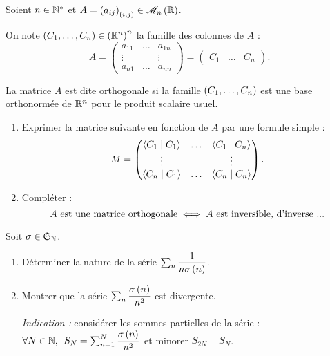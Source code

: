 \begin{exo}
Soient \(n\in\mathbb{N}^*\) et \(A=\paren{a_{ij}}_{\paren{i,j}}\in\M{n}[\R]\).

On note \(\left(C_1,\dots,C_n\right)\in\left(\mathbb{R}^n\right)^n\) la famille des colonnes de \(A\) : \[A=\begin{pmatrix}
a_{11} & \dots & a_{1n} \\
\vdots &  & \vdots \\
a_{n1} & \dots & a_{nn}
\end{pmatrix}=\begin{pmatrix}
C_1 & \dots & C_n
\end{pmatrix}.\]

La matrice \(A\) est dite orthogonale si la famille \(\left(C_1,\dots,C_n\right)\) est une base orthonormée de \(\mathbb{R}^n\) pour le produit scalaire usuel.

\begin{enumerate}
\item Exprimer la matrice suivante en fonction de \(A\) par une formule simple : \[M=\begin{pmatrix}
\left\langle C_1\;\middle|\; C_1\right\rangle & \dots & \left\langle C_1\;\middle|\; C_n\right\rangle \\
\vdots &  & \vdots \\
\left\langle C_n\;\middle|\; C_1\right\rangle & \dots & \left\langle C_n\;\middle|\; C_n\right\rangle
\end{pmatrix}.\]

\item Compléter : \[A\text{ est une matrice orthogonale}\iff A\text{ est inversible, d'inverse ...}\]
\end{enumerate}
\end{exo}

\begin{corr}
\end{corr}

\begin{exo}[Exercice 18]
Soit \(\sigma\in\frak{S}_{\mathbb{N}}\).

\begin{enumerate}
\item Déterminer la nature de la série \(\sum_n\dfrac{1}{n\sigma\left(n\right)}\). \\

\item Montrer que la série \(\sum_n\dfrac{\sigma\left(n\right)}{n^2}\) est divergente.

\textit{Indication :} considérer les sommes partielles de la série : \(\quantifs{\forall N\in\N}S_N=\sum_{n=1}^N\dfrac{\sigma\paren{n}}{n^2}\) et minorer \(S_{2N}-S_N\).
\end{enumerate}
\end{exo}

\begin{corr}
\end{corr}